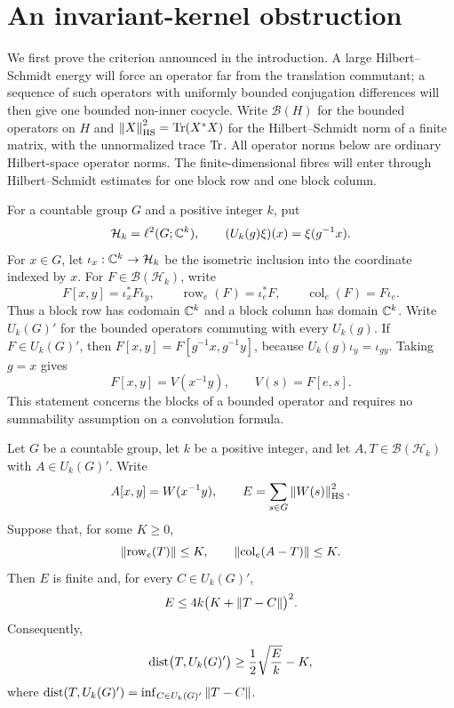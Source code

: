 \section{An invariant-kernel obstruction}
\label{sec:obstruction}

We first prove the criterion announced in the introduction. A large
Hilbert--Schmidt energy will force an operator far from the translation
commutant; a sequence of such operators with uniformly bounded
conjugation differences will then give one bounded non-inner cocycle.
Write $\mathcal B(H)$ for the bounded operators on $H$ and
$\left\lVert X\right\rVert_{\mathrm{HS}}^2=\operatorname{Tr}(X^*X)$ for the Hilbert--Schmidt norm of a
finite matrix, with the unnormalized trace $\operatorname{Tr}$.
All operator norms below are ordinary Hilbert-space operator norms.
The finite-dimensional fibres will enter through
Hilbert--Schmidt estimates for one block row and one block column.

For a countable group $G$ and a positive integer $k$, put
\[
  \mathcal H_k=\ell^2(G;\mathbb C^k),
  \qquad (U_k(g)\xi)(x)=\xi(g^{-1}x).
\]
For $x\in G$, let $\iota_x:\mathbb C^k\to\mathcal H_k$ be the isometric
inclusion into the coordinate indexed by $x$.
For $F\in\mathcal B(\mathcal H_k)$, write
\[
  F[x,y]=\iota_x^*F\iota_y,\qquad
  \operatorname{row}_e(F)=\iota_e^*F,\qquad
  \operatorname{col}_e(F)=F\iota_e.
\]
Thus a block row has codomain $\mathbb C^k$ and a block column has domain
$\mathbb C^k$. Write $U_k(G)'$ for the bounded operators commuting with
every $U_k(g)$. If $F\in U_k(G)'$, then
$F[x,y]=F[g^{-1}x,g^{-1}y]$, because $U_k(g)\iota_y=\iota_{gy}$.
Taking $g=x$ gives
\[
  F[x,y]=V(x^{-1}y),\qquad V(s)=F[e,s].
\]
This statement concerns the blocks of a bounded operator and requires
no summability assumption on a convolution formula.

\begin{lemma}
\label{lem:kernel-obstruction}
Let $G$ be a countable group, let $k$ be a positive integer, and let
$A,T\in\mathcal B(\mathcal H_k)$ with $A\in U_k(G)'$.
Write
\[
  A[x,y]=W(x^{-1}y),\qquad
  E=\sum_{s\in G}\left\lVert W(s)\right\rVert_{\mathrm{HS}}^2.
\]
Suppose that, for some $K\ge0$,
\[
  \left\lVert\operatorname{row}_e(T)\right\rVert\le K,
  \qquad
  \left\lVert\operatorname{col}_e(A-T)\right\rVert\le K.
\]
Then $E$ is finite and, for every $C\in U_k(G)'$,
\begin{equation}
\label{eq:kernel-energy-obstruction}
  E\le 4k\bigl(K+\left\lVert T-C\right\rVert\bigr)^2.
\end{equation}
Consequently,
\begin{equation}
\label{eq:kernel-distance-obstruction}
  \operatorname{dist}\bigl(T,U_k(G)'\bigr)
  \ge \frac12\sqrt{\frac{E}{k}}-K,
\end{equation}
where $\operatorname{dist}(T,U_k(G)')=\inf_{C\in U_k(G)'}\left\lVert T-C\right\rVert$.
\end{lemma}

